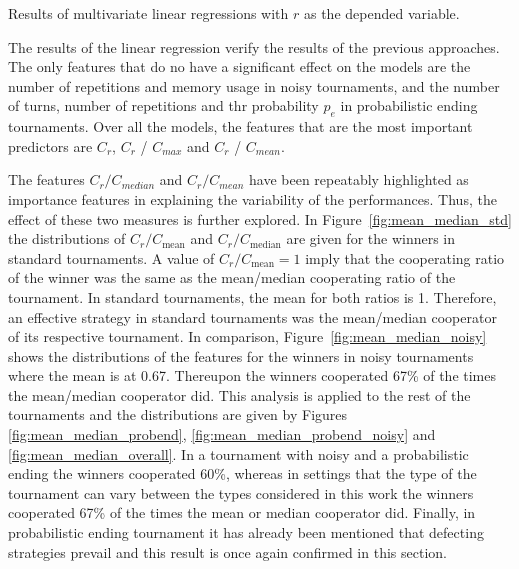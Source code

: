 \documentclass{article}
\begin{document}
\begin{table}[h]
    \begin{center}
\resizebox{.8\textwidth}{!}{
    }
    \end{center}
    \caption{Results of multivariate linear regressions with \(r\) as the depended variable.}
    \label{table:linear_regression}
\end{table}

The results of the linear regression verify the results of the previous
approaches. The only features that do no have a significant effect on the
models are the number of repetitions and memory usage in noisy tournaments,
and the number of turns, number of repetitions and thr probability \(p_e\) in
probabilistic ending tournaments. Over all the models, the features that are the
most important predictors are $C_r$, $C_r$ / $C_{max}$ and $C_r$ / $C_{mean}$.

The features $C_{r} / C_{median}$ and $C_r / C_{mean}$ have been repeatably
highlighted as importance features in explaining the variability of the performances.
Thus, the effect of these two measures is further explored. In
Figure~\ref{fig:mean_median_std} the distributions of \(C_r / C_{\text{mean}}\)
and \(C_r / C_{\text{median}}\) are given for the winners in standard tournaments. A value of \(C_r /
C_{\text{mean}} = 1\) imply that the cooperating ratio of the winner was the
same as the mean/median cooperating ratio of the tournament. In standard tournaments, the mean
for both ratios is 1. Therefore, an effective strategy in standard tournaments
was the mean/median cooperator of its respective tournament. In comparison,
Figure~\ref{fig:mean_median_noisy} shows the distributions of the features for
the winners in noisy tournaments where the mean is at 0.67. Thereupon the winners
cooperated 67\% of the times the mean/median cooperator did. This analysis is
applied to the rest of the tournaments and the distributions are given by
Figures \ref{fig:mean_median_probend}, \ref{fig:mean_median_probend_noisy} and
\ref{fig:mean_median_overall}. In a tournament with noisy and a probabilistic
ending the winners cooperated 60\%, whereas in settings that the type of the
tournament can vary between the types considered in this work the winners
cooperated 67\% of the times the mean or median cooperator did. Finally, in
probabilistic ending tournament it has already been mentioned that defecting
strategies prevail and this result is once again confirmed in this section.
\end{document}
